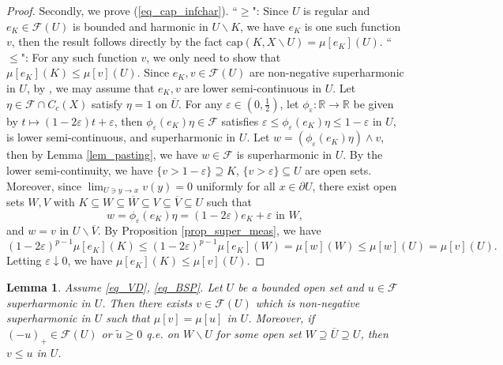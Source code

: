 \documentclass[11pt,a4paper]{article}
\numberwithin{equation}{section}
\theoremstyle{plain}
\newtheorem{lemma}[theorem]{Lemma}
\theoremstyle{definition}
\begin{document}
\begin{proof}
Secondly, we prove (\ref{eq_cap_infchar}). ``$\ge$": Since $U$ is regular and $e_K\in \mathcal{F}(U)$ is bounded and harmonic in $U\backslash K$, we have $e_K$ is one such function $v$, then the result follows directly by the fact $\mathrm{cap}(K,X\backslash U)=\mu[e_K](U)$. ``$\le$": For any such function $v$, we only need to show that $\mu[e_K](K)\le \mu[v](U)$. Since $e_K, v\in \mathcal{F}(U)$ are non-negative superharmonic in $U$, by \hyperlink{eq_LSC}{}, we may assume that $e_K, v$ are lower semi-continuous in $U$. Let $\eta\in \mathcal{F}\cap C_c(X)$ satisfy $\eta=1$ on $\overline{U}$. For any $\varepsilon\in(0,\frac{1}{2})$, let $\phi_\varepsilon:\mathbb{R}\to \mathbb{R}$ be given by $t\mapsto (1-2\varepsilon)t+\varepsilon$, then $\phi_\varepsilon(e_K)\eta\in \mathcal{F}$ satisfies $\varepsilon\le \phi_\varepsilon(e_K)\eta\le 1-\varepsilon$ in $U$, is lower semi-continuous, and superharmonic in $U$. Let $w=(\phi_\varepsilon(e_K)\eta)\wedge v$, then by Lemma \ref{lem_pasting}, we have $w\in \mathcal{F}$ is superharmonic in $U$. By the lower semi-continuity, we have $\{v>1-\varepsilon\}\supseteq K$, $\{v>\varepsilon\}\subseteq U$ are open sets. Moreover, since $\lim_{U\ni y\to x}v(y)=0$ uniformly for all $x\in \partial U$, there exist open sets $W,V$ with $K\subseteq W\subseteq \overline{W}\subseteq V\subseteq \overline{V}\subseteq U$ such that
$$w=\phi_\varepsilon(e_K)\eta=(1-2\varepsilon)e_K+\varepsilon\text{ in }W,$$
and $w=v\text{ in }U\backslash \overline{V}$. By Proposition \ref{prop_super_meas}, we have
$$(1-2\varepsilon)^{p-1}\mu[e_K](K)\le (1-2\varepsilon)^{p-1}\mu[e_K](W)=\mu[w](W)\le \mu[w](U)=\mu[v](U).$$
Letting $\varepsilon\downarrow0$, we have $\mu[e_K](K)\le\mu[v](U)$.
\end{proof}

\begin{lemma}\label{lem_FU_modi}
Assume \ref{eq_VD}, \ref{eq_BSP}. Let $U$ be a bounded open set and $u\in\mathcal{F}$ superharmonic in $U$. Then there exists $v\in\mathcal{F}(U)$ which is non-negative superharmonic in $U$ such that $\mu[v]=\mu[u]$ in $U$. Moreover, if $(-u)_+\in \mathcal{F}(U)$ or $\widetilde{u}\ge0$ q.e. on $W\backslash U$ for some open set $W\supseteq\overline{U}\supseteq U$, then $v\le u$ in $U$.
\end{lemma}
\end{document}
